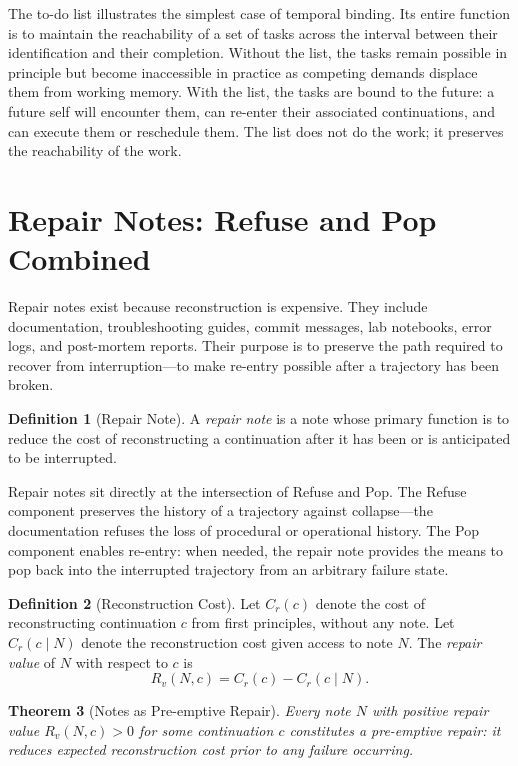 \documentclass[12pt, a4paper]{article}
\theoremstyle{plain}
\newtheorem{theorem}{Theorem}[section]
\theoremstyle{definition}
\newtheorem{definition}[theorem]{Definition}
\theoremstyle{remark}
\begin{document}
The to-do list illustrates the simplest case of temporal binding. Its entire
function is to maintain the reachability of a set of tasks across the interval
between their identification and their completion. Without the list, the tasks
remain possible in principle but become inaccessible in practice as competing
demands displace them from working memory. With the list, the tasks are bound to
the future: a future self will encounter them, can re-enter their associated
continuations, and can execute them or reschedule them. The list does not do the
work; it preserves the reachability of the work.

\section{Repair Notes: Refuse and Pop Combined}

Repair notes exist because reconstruction is expensive. They include documentation,
troubleshooting guides, commit messages, lab notebooks, error logs, and post-mortem
reports. Their purpose is to preserve the path required to recover from
interruption---to make re-entry possible after a trajectory has been broken.

\begin{definition}[Repair Note]
A \emph{repair note} is a note whose primary function is to reduce the cost of
reconstructing a continuation after it has been or is anticipated to be
interrupted.
\end{definition}

Repair notes sit directly at the intersection of Refuse and Pop. The Refuse
component preserves the history of a trajectory against collapse---the documentation
refuses the loss of procedural or operational history. The Pop component enables
re-entry: when needed, the repair note provides the means to pop back into the
interrupted trajectory from an arbitrary failure state.

\begin{definition}[Reconstruction Cost]
Let $C_r(c)$ denote the cost of reconstructing continuation $c$ from first
principles, without any note. Let $C_r(c \mid N)$ denote the reconstruction cost
given access to note $N$. The \emph{repair value} of $N$ with respect to $c$ is
\[
R_v(N, c) = C_r(c) - C_r(c \mid N).
\]
\end{definition}

\begin{theorem}[Notes as Pre-emptive Repair]
Every note $N$ with positive repair value $R_v(N, c) > 0$ for some continuation
$c$ constitutes a pre-emptive repair: it reduces expected reconstruction cost
prior to any failure occurring.
\end{theorem}
\end{document}
